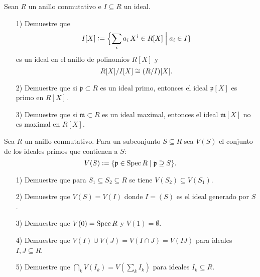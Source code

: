 \begin{ejercicio}
  Sean $R$ un anillo conmutativo e $I \subseteq R$ un ideal.

  \begin{enumerate}
  \item[1)] Demuestre que
    $$I [X] \mathrel{\mathop:}= \Bigl\{ \sum_i a_i\,X^i \in R [X] \Bigm| a_i \in I \}$$
    es un ideal en el anillo de polinomios $R [X]$ y
    $$R [X] / I [X] \cong (R/I) [X].$$

  \item[2)] Demuestre que si $\mathfrak{p} \subset R$ es un ideal primo,
    entonces el ideal $\mathfrak{p} [X]$ es primo en $R [X]$.

  \item[3)] Demuestre que si $\mathfrak{m} \subset R$ es un ideal maximal,
    entonces el ideal $\mathfrak{m} [X]$ no es maximal en $R [X]$.
  \end{enumerate}
\end{ejercicio}

\begin{ejercicio}
  Sea $R$ un anillo conmutativo. Para un subconjunto $S \subseteq R$ sea $V (S)$
  el conjunto de los ideales primos que contienen a $S$:
  $$V (S) \mathrel{\mathop:}= \{ \mathfrak{p} \in \operatorname{Spec} R \mid \mathfrak{p} \supseteq S \}.$$

  \begin{enumerate}
  \item[1)] Demuestre que para $S_1 \subseteq S_2 \subseteq R$ se tiene
    $V (S_2) \subseteq V (S_1)$.

  \item[2)] Demuestre que $V (S) = V (I)$ donde $I = (S)$ es el ideal generado
    por $S$.

  \item[3)] Demuestre que $V (0) = \operatorname{Spec} R$ y $V (1) = \emptyset$.

  \item[4)] Demuestre que $V (I) \cup V (J) = V (I \cap J) = V (IJ)$ para
    ideales $I,J \subseteq R$.

  \item[5)] Demuestre que $\bigcap_k V (I_k) = V (\sum_k I_k)$ para ideales
    $I_k \subseteq R$.
  \end{enumerate}
\end{ejercicio}

